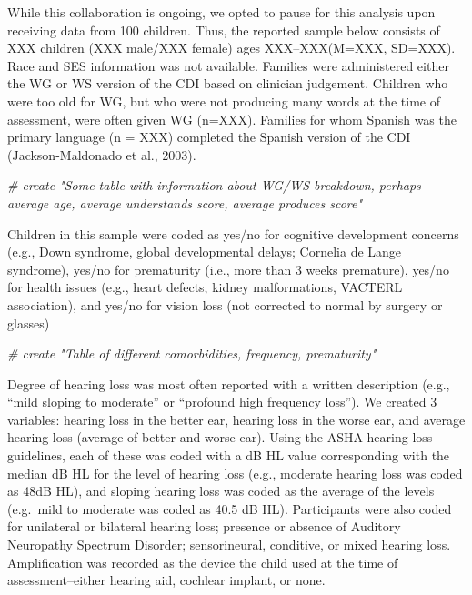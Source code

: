 \documentclass[
]{article}
\newenvironment{Shaded}{\begin{snugshade}}{\end{snugshade}}
\newcommand{\CommentTok}[1]{\textcolor[rgb]{0.56,0.35,0.01}{\textit{#1}}}
\begin{document}
While this collaboration is ongoing, we opted to pause for this analysis
upon receiving data from 100 children. Thus, the reported sample below
consists of XXX children (XXX male/XXX female) ages XXX--XXX(M=XXX,
SD=XXX). Race and SES information was not available. Families were
administered either the WG or WS version of the CDI based on clinician
judgement. Children who were too old for WG, but who were not producing
many words at the time of assessment, were often given WG (n=XXX).
Families for whom Spanish was the primary language (n = XXX) completed
the Spanish version of the CDI (Jackson-Maldonado et al., 2003).

\begin{Shaded}
\begin{Highlighting}[]
\CommentTok{# create "Some table with information about WG/WS breakdown, perhaps average age, average understands score, average produces score"}
\end{Highlighting}
\end{Shaded}

Children in this sample were coded as yes/no for cognitive development
concerns (e.g., Down syndrome, global developmental delays; Cornelia de
Lange syndrome), yes/no for prematurity (i.e., more than 3 weeks
premature), yes/no for health issues (e.g., heart defects, kidney
malformations, VACTERL association), and yes/no for vision loss (not
corrected to normal by surgery or glasses)

\begin{Shaded}
\begin{Highlighting}[]
\CommentTok{# create "Table of different comorbidities, frequency, prematurity"}
\end{Highlighting}
\end{Shaded}

Degree of hearing loss was most often reported with a written
description (e.g., ``mild sloping to moderate'' or ``profound high
frequency loss''). We created 3 variables: hearing loss in the better
ear, hearing loss in the worse ear, and average hearing loss (average of
better and worse ear). Using the ASHA hearing loss guidelines, each of
these was coded with a dB HL value corresponding with the median dB HL
for the level of hearing loss (e.g., moderate hearing loss was coded as
48dB HL), and sloping hearing loss was coded as the average of the
levels (e.g.~mild to moderate was coded as 40.5 dB HL). Participants
were also coded for unilateral or bilateral hearing loss; presence or
absence of Auditory Neuropathy Spectrum Disorder; sensorineural,
conditive, or mixed hearing loss. Amplification was recorded as the
device the child used at the time of assessment--either hearing aid,
cochlear implant, or none.
\end{document}
